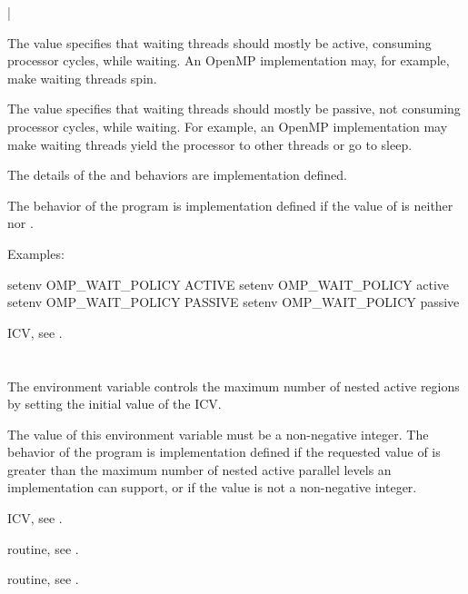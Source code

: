{|}

The  value specifies that waiting threads should mostly be
active, consuming processor cycles, while waiting. An OpenMP implementation
may, for example, make waiting threads spin.

The  value specifies that waiting threads should mostly be
passive, not consuming processor cycles, while waiting. For example, an
OpenMP implementation may make waiting threads yield the processor to
other threads or go to sleep.

The details of the  and  behaviors are
implementation defined.

The behavior of the program is implementation defined if the value of
 is neither  nor .

Examples:
\begin{ompEnv}
setenv OMP_WAIT_POLICY ACTIVE
setenv OMP_WAIT_POLICY active
setenv OMP_WAIT_POLICY PASSIVE
setenv OMP_WAIT_POLICY passive
\end{ompEnv}

\begin{crossrefs}
\item {} ICV, see .
\end{crossrefs}



\section{}
\label{sec:OMP_MAX_ACTIVE_LEVELS}
The  environment variable controls the maximum number
of nested active  regions by setting the initial value of the
 ICV.

The value of this environment variable must be a non-negative integer. The
behavior of the program is implementation defined if the requested value of
 is greater than the maximum number of nested
active parallel levels an implementation can support, or if the value is not a
non-negative integer.

\begin{crossrefs}
\item {} ICV, see .

\item {} routine,
see .

\item {} routine,
see .
\end{crossrefs}



